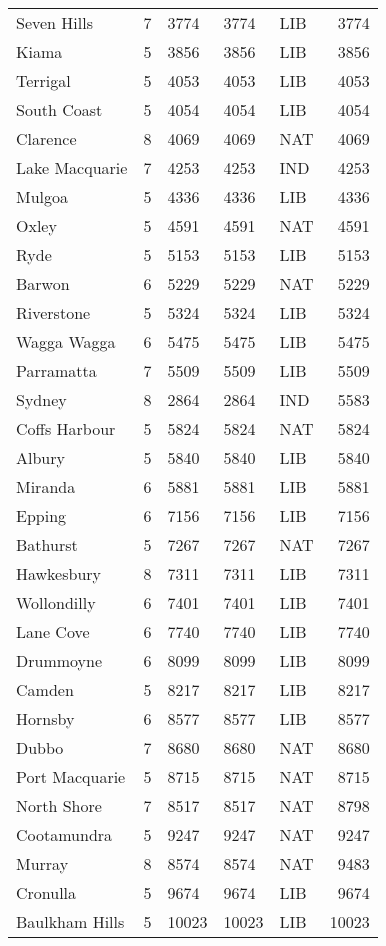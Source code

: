 \documentclass{article}
\begin{document}
\begin{center}
\begin{longtable}{lllllr}
Seven Hills & 7 & 3774 & 3774 & LIB & 3774\\
Kiama & 5 & 3856 & 3856 & LIB & 3856\\
Terrigal & 5 & 4053 & 4053 & LIB & 4053\\
South Coast & 5 & 4054 & 4054 & LIB & 4054\\
Clarence & 8 & 4069 & 4069 & NAT & 4069\\
Lake Macquarie & 7 & 4253 & 4253 & IND & 4253\\
Mulgoa & 5 & 4336 & 4336 & LIB & 4336\\
Oxley & 5 & 4591 & 4591 & NAT & 4591\\
Ryde & 5 & 5153 & 5153 & LIB & 5153\\
Barwon & 6 & 5229 & 5229 & NAT & 5229\\
Riverstone & 5 & 5324 & 5324 & LIB & 5324\\
Wagga Wagga & 6 & 5475 & 5475 & LIB & 5475\\
Parramatta & 7 & 5509 & 5509 & LIB & 5509\\
Sydney & 8 & 2864 & 2864 & IND & 5583\\
Coffs Harbour & 5 & 5824 & 5824 & NAT & 5824\\
Albury & 5 & 5840 & 5840 & LIB & 5840\\
Miranda & 6 & 5881 & 5881 & LIB & 5881\\
Epping & 6 & 7156 & 7156 & LIB & 7156\\
Bathurst & 5 & 7267 & 7267 & NAT & 7267\\
Hawkesbury & 8 & 7311 & 7311 & LIB & 7311\\
Wollondilly & 6 & 7401 & 7401 & LIB & 7401\\
Lane Cove & 6 & 7740 & 7740 & LIB & 7740\\
Drummoyne & 6 & 8099 & 8099 & LIB & 8099\\
Camden & 5 & 8217 & 8217 & LIB & 8217\\
Hornsby & 6 & 8577 & 8577 & LIB & 8577\\
Dubbo & 7 & 8680 & 8680 & NAT & 8680\\
Port Macquarie & 5 & 8715 & 8715 & NAT & 8715\\
North Shore & 7 & 8517 & 8517 & NAT & 8798\\
Cootamundra & 5 & 9247 & 9247 & NAT & 9247\\
Murray & 8 & 8574 & 8574 & NAT & 9483\\
Cronulla & 5 & 9674 & 9674 & LIB & 9674\\
Baulkham Hills & 5 & 10023 & 10023 & LIB & 10023\\

\end{longtable}
\end{center}
\end{document}
